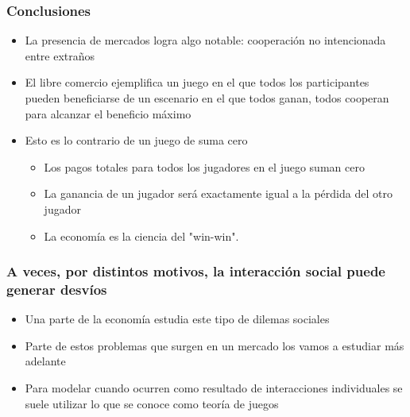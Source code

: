 \documentclass{beamer}
\begin{document}
\begin{frame}
\frametitle{Conclusiones}
\begin{itemize}
    \item La presencia de mercados logra algo notable: cooperación no intencionada entre extraños\vspace{4mm}
    \item El libre comercio ejemplifica un juego en el que todos los participantes pueden beneficiarse de un escenario en el que todos ganan, todos cooperan para alcanzar el beneficio máximo \vspace{4mm}
    \item Esto es lo contrario de un juego de suma cero\vspace{2mm}
    \begin{itemize}
      \item Los pagos totales para todos los jugadores en el juego suman cero\vspace{2mm}
    \item La ganancia de un jugador será exactamente igual a la pérdida del otro jugador\vspace{2mm}
  \item La economía es la ciencia del "win-win". 
    \end{itemize}
    
\end{itemize}
\end{frame}

\begin{frame}
\frametitle{A veces, por distintos motivos, la interacción social puede generar desvíos}
\begin{itemize}
    \item Una parte de la economía estudia este tipo de dilemas sociales\vspace{4mm}
     \item Parte de estos problemas que surgen en un mercado los vamos a estudiar más adelante\vspace{4mm}
    \item Para modelar cuando ocurren como resultado de interacciones individuales se suele utilizar lo que se conoce como teoría de juegos
    \end{itemize}
\end{frame}
\end{document}
